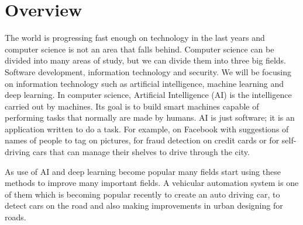\section{Overview}

The world is progressing fast enough on technology in the last years and computer science is not an area that falls behind. Computer science can be divided into many areas of study, but we can divide them into three big fields. Software development, information technology and security. We will be focusing on information technology such as artificial intelligence, machine learning and deep learning. In computer science, Artificial Intelligence (AI) is the intelligence carried out by machines. Its goal is to build smart machines capable of performing tasks that normally are made by humans. AI is just software; it is an application written to do a task. For example, on Facebook with suggestions of names of people to tag on pictures, for fraud detection on credit cards or for self- driving cars that can manage their shelves to drive through the city.

As use of AI and deep learning become popular many fields start using these methods to improve many important fields. A vehicular automation system is one of them which is becoming popular recently to create an auto driving car, to detect cars on the road and also making improvements in urban designing for roads. 


